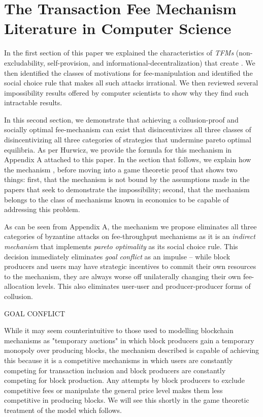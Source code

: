 \documentclass[sigconf,anonymous]{aamas}
\begin{document}
\section{The Transaction Fee Mechanism Literature in Computer Science\label{sec::section1p2}}

In the first section of this paper we explained the characteristics of \textit{TFMs} (non-excludability, self-provision, and informational-decentralization) that create . We then identified the classes of motivations for fee-manipulation and identified the social choice rule that makes all such attacks irrational. We then reviewed several impossibility results offered by computer scientists to show why they find such intractable results.

In this second section, we demonstrate that achieving a collusion-proof and socially optimal fee-mechanism can exist that disincentivizes all three classes of disincentivizing all three categories of strategies that undermine pareto optimal equilibria. As per Hurwicz, we provide the formula for this mechanism in Appendix A attached to this paper. In the section that follows, we explain how the mechanism , before moving into a game theoretic proof that shows two things: first, that the mechanism is not bound by the assumptions made in the papers that seek to demonstrate the impossibility; second, that the mechanism belongs to the class of mechanisms known in economics to be capable of addressing this problem.

As can be seen from Appendix A, the mechanism we propose eliminates all three categories of byzantine attacks on fee-throughput mechanisms as it is an \textit{indirect mechanism} that implements \textit{pareto optimality} as its social choice rule. This decision immediately eliminates \textit{goal conflict} as an impulse -- while block producers and users may have strategic incentives to commit their own resources to the mechanism, they are always worse off unilaterally changing their own fee-allocation levels. This also eliminates user-user and producer-producer forms of collusion.

GOAL CONFLICT

While it may seem counterintuitive to those used to modelling blockchain mechanisms as "temporary auctions" in which block producers gain a temporary monopoly over producing blocks, the mechanism described is capable of achieving this because it is a competitive mechanisms in which users are constantly competing for transaction inclusion and block producers are constantly competing for block production. Any attempts by block producers to exclude competitive fees or manipulate the general price level makes them less competitive in producing blocks. We will see this shortly in the game theoretic treatment of the model which follows.
\end{document}
